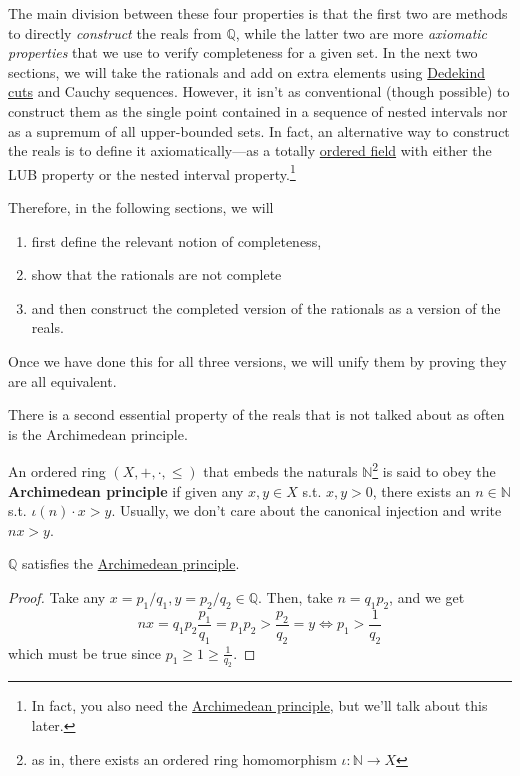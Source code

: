   The main division between these four properties is that the first two are methods to directly \textit{construct} the reals from $\mathbb{Q}$, while the latter two are more \textit{axiomatic properties} that we use to verify completeness for a given set. In the next two sections, we will take the rationals and add on extra elements using \hyperref[alg-def:dedekind-cut]{Dedekind cuts} and Cauchy sequences. However, it isn't as conventional (though possible) to construct them as the single point contained in a sequence of nested intervals nor as a supremum of all upper-bounded sets. In fact, an alternative way to construct the reals is to define it axiomatically---as a totally \hyperref[alg-def:ordered-field]{ordered field} with either the LUB property or the nested interval property.\footnote{In fact, you also need the \hyperref[alg-def:archimedean-principle]{Archimedean principle}, but we'll talk about this later.} 

  Therefore, in the following sections, we will 
  \begin{enumerate}
    \item first define the relevant notion of completeness, 
    \item show that the rationals are not complete 
    \item and then construct the completed version of the rationals as a version of the reals. 
  \end{enumerate}
  Once we have done this for all three versions, we will unify them by proving they are all equivalent. 

  There is a second essential property of the reals that is not talked about as often is the Archimedean principle. 

  \begin{definition}
    \label{def:archimedean-principle}
    An ordered ring $(X, +, \cdot, \leq)$ that embeds the naturals $\mathbb{N}$\footnote{as in, there exists an ordered ring homomorphism $\iota: \mathbb{N} \rightarrow X$} is said to obey the \textbf{Archimedean principle} if given any $x, y \in X$ s.t. $x, y > 0$, there exists an $n \in \mathbb{N}$ s.t. $\iota(n) \cdot x > y$. Usually, we don't care about the canonical injection and write $nx > y$. 
  \end{definition} 
  
  \begin{lemma}
    \label{thm:rationals-are-archimedean}
    $\mathbb{Q}$ satisfies the \hyperref[def:archimedean-principle]{Archimedean principle}. 
  \end{lemma}
  \begin{proof}
    Take any $x = p_1/q_1, y = p_2 / q_2 \in \mathbb{Q}$. Then, take $n = q_1 p_2$, and we get 
    \begin{equation}
      n x = q_1 p_2 \frac{p_1}{q_1} = p_1 p_2 > \frac{p_2}{q_2} = y \iff p_1 > \frac{1}{q_2}
    \end{equation}
    which must be true since $p_1 \geq 1 \geq \frac{1}{q_2}$. 
  \end{proof}

